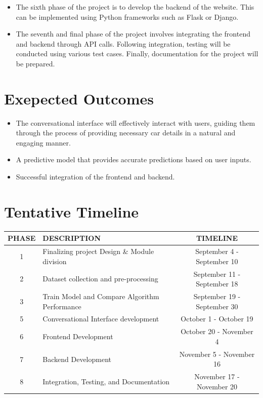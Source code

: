 \documentclass[a4paper,12pt]{article}
\begin{document}
\begin{justify}
\begin{itemize}
\item The sixth phase of the project is to develop the backend of the website. This can be implemented using Python frameworks such as Flask or Django.


\item The seventh and final phase of the project involves integrating the frontend and backend through API calls. Following integration, testing will be conducted using various test cases. Finally, documentation for the project will be prepared.
\end{itemize}
\newpage
\section*{Exepected Outcomes}
	\begin{itemize}
		\item The conversational interface will effectively interact with users, guiding them through the process of providing necessary car details in a natural and engaging manner.
		\item A predictive model that provides accurate predictions based on user inputs.
		\item Successful integration of the frontend and backend.

	 \end{itemize}

\section*{Tentative Timeline}
\begin{tabular}{|c|p{7cm}|c|}
\hline
\textbf{PHASE} & \textbf{DESCRIPTION} & \textbf{TIMELINE} \\ \hline
1 & Finalizing project Design \& Module division & September 4 - September 10 \\ \hline
2 & Dataset collection and pre-processing & September 11 - September 18 \\ \hline
3 & Train Model and Compare Algorithm Performance & September 19 - September 30 \\ \hline
5 & Conversational Interface development & October 1 - October 19 \\ \hline
6 & Frontend Development & October 20 - November 4 \\ \hline
7 & Backend Development & November 5 - November 16 \\ \hline
8 & Integration, Testing, and Documentation & November 17 - November 20 \\ \hline
\end{tabular}



\end{justify}
\end{document}
